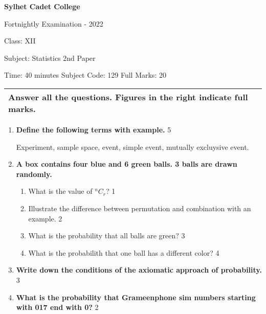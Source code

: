 \documentclass{article}
\begin{document}
\begin{center}
  \bfseries\large
  Sylhet Cadet College

\normalsize
Fortnightly Examination - 2022

  Class: XII

  Subject: Statistics 2nd Paper

  Time: 40 minutes \qquad \qquad  \qquad \qquad Subject Code: 129  \qquad  \qquad \qquad  \qquad Full Marks: 20

\end{center}

\noindent
\begin{tabular}{p{\dimexpr\linewidth-2\tabcolsep}}
  Answer all the questions. Figures in the right indicate full marks.\\
  \hline
\end{tabular}

\begin{enumerate}
  \item
  \textbf{Define the following terms with example.}  \hfill 5

Experiment, sample space, event, simple event, mutually excluysive event. 

 \item
	  \textbf{A box contains four blue and 6 green balls. 3 balls are drawn randomly.} 
  
  \begin{enumerate}
    \item
	What is the value of $^nC_r$? \hfill 1
    \item
	Illustrate the difference between permutation and combination with an example. \hfill 2
    \item  
	What is the probability that all balls are green? \hfill 3
    \item
	What is the probabilith that one ball has a different color? \hfill 4
  \end{enumerate}

 \item
	  \textbf{Write down the conditions of the axiomatic approach of probability.} \hfill 3

 \item
	  \textbf{What is the probability that Grameenphone sim numbers starting with 017 end with 0?} \hfill 2	  \linebreak \linebreak \linebreak  \linebreak
	  
\end{enumerate}
\end{document}
